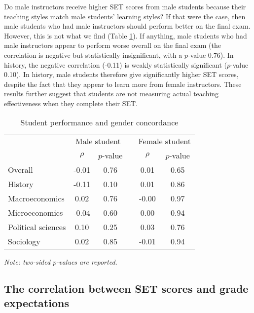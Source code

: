 \documentclass[12pt]{article}
\begin{document}
Do male instructors receive higher SET scores from male students because their teaching styles match male students' learning styles? If that were the case, then male students who had male instructors should perform better on the final exam. However, this is not what we find (Table \ref{tab:finalconcordance}). If anything, male students who had male instructors appear to perform worse overall on the final exam (the correlation is negative but statistically insignificant, with a $p$-value 0.76). In history, the negative correlation (-0.11) is weakly statistically significant ($p$-value 0.10). In history, male students therefore give significantly higher SET scores, despite the fact that they appear to learn more from female instructors. These results further suggest that students are not measuring actual teaching effectiveness when they complete their SET. 




\begin{table}[htbp]
  \centering
  \footnotesize 
  \caption{Student performance and gender concordance}
    \begin{tabular}{lccccc}
    \toprule 
          & \multicolumn{2}{c}{Male student}  &  & \multicolumn{2}{c}{Female student} \\
      & $\rho$  &  $p$-value &  & $\rho$  &  $p$-value    \\
                             \midrule
      \quad  Overall &                 -0.01       & 0.76 & &  0.01       & 0.65  \\
      \quad  History &                 -0.11       & 0.10 & &  0.01       & 0.86   \\
      \quad  Macroeconomics &           0.02       & 0.76 & & -0.00       & 0.97   \\
      \quad  Microeconomics &          -0.04       & 0.60 & &  0.00       & 0.94  \\
      \quad  Political sciences &       0.10       & 0.25 & &  0.03       & 0.76  \\
      \quad  Sociology &                0.02       & 0.85 & & -0.01       & 0.94  \\
    \bottomrule
    \end{tabular}%
 \label{tab:finalconcordance}%
  
  \textit{Note: two-sided $p$-values are reported.}
\end{table}%
\normalsize





\subsection{The correlation between SET scores and grade expectations}
\end{document}
